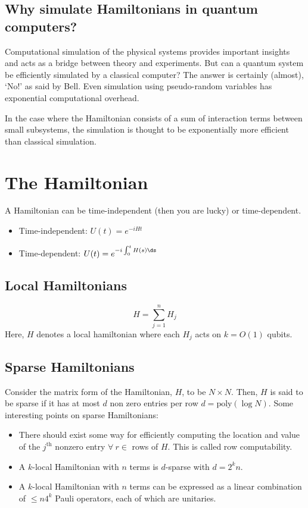 \documentclass[
10pt, %
a4paper, %
oneside, %
headinclude,footinclude, %
BCOR5mm, %
]{scrartcl}
\begin{document}
\subsection{Why simulate Hamiltonians in quantum computers?}
Computational simulation of the physical systems provides important insights and acts as a bridge between theory and experiments. But can a quantum system be efficiently simulated by a classical computer? The answer is certainly (almost), ‘No!’ as said by Bell. Even simulation using pseudo-random variables has exponential computational overhead.\newline

In the case where the Hamiltonian consists of a sum of interaction terms between small subsystems, the simulation is thought to be exponentially more efficient than classical simulation.

\section{The Hamiltonian}
A Hamiltonian can be time-independent (then you are lucky) or time-dependent.
\begin{itemize}
    \item Time-independent: $U(t) = e^{-iHt}$
    \item Time-dependent: $U(t) = e^{-i \int_0^t H(s) \ds}$
\end{itemize}
\subsection{Local Hamiltonians}
$$H = \sum_{j = 1}^n H_j$$
Here, $H$ denotes a local hamiltonian where each $H_j$ acts on $k = O(1)$ qubits.

\subsection{Sparse Hamiltonians}
Consider the matrix form of the Hamiltonian, $H$, to be $N\times N$. Then, $H$ is said to be sparse if it has at most $d$ non zero entries per row $d = \text{poly}(\log N)$. Some interesting points on sparse Hamiltonians:
\begin{itemize}
    \item There should exist some way for efficiently computing the location and value of the $j^\text{th}$ nonzero entry $\forall\ r \in$ rows of $H$. This is called row computability.
    \item A $k$-local Hamiltonian with $n$ terms is $d$-sparse with $d = 2^k n$.
    \item A $k$-local Hamiltonian with $n$ terms can be expressed as a linear combination of $\leq n4^k$ Pauli operators, each of which are unitaries.
\end{itemize}
\end{document}
